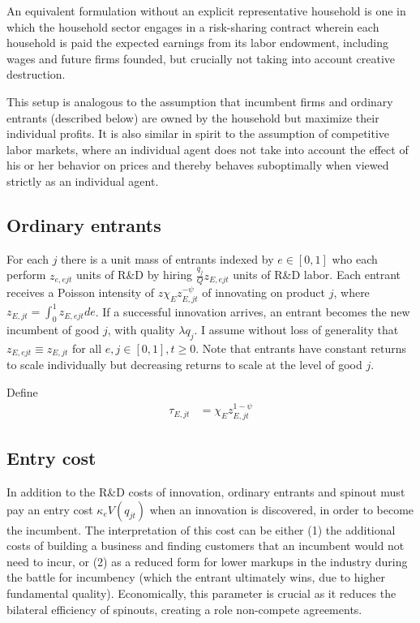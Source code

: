 \documentclass[12pt,english]{article}
\theoremstyle{remark}
\begin{document}
An equivalent formulation without an explicit representative household is one in which the household sector engages in a risk-sharing contract wherein each household is paid the expected earnings from its labor endowment, including wages and future firms founded, but crucially not taking into account creative destruction.  

This setup is analogous to the assumption that incumbent firms and ordinary entrants (described below) are owned by the household but maximize their individual profits. It is also similar in spirit to the assumption of competitive labor markets, where an individual agent does not take into account the effect of his or her behavior on prices and thereby behaves suboptimally when viewed strictly as an individual agent. 


\subsection{Ordinary entrants}

For each $j$ there is a unit mass of entrants indexed by $e \in [0,1]$ who each perform $z_{e,ejt}$ units of R\&D by hiring $\frac{q_j}{Q} z_{E,ejt}$ units of R\&D labor. Each entrant receives a Poisson intensity of $z \chi_E z_{E,jt}^{-\psi}$ of innovating on product $j$, where $z_{E,jt} = \int_0^1 z_{E,ejt} de$. If a successful innovation arrives, an entrant becomes the new incumbent of good $j$, with quality $\lambda q_j$. I assume without loss of generality that $z_{E,ejt} \equiv z_{E,jt}$ for all $e,j \in [0,1], t \ge 0$. Note that entrants have constant returns to scale individually but decreasing returns to scale at the level of good $j$.

Define
\begin{align*}
	\tau_{E,jt} &= \chi_E z_{E,jt}^{1-\psi}
\end{align*}


\subsection{Entry cost}

In addition to the R\&D costs of innovation, ordinary entrants and spinout must pay an entry cost $\kappa_{e} V(q_{jt})$ when an innovation is discovered, in order to become the incumbent. The interpretation of this cost can be either (1) the additional costs of building a business and finding customers that an incumbent would not need to incur, or (2) as a reduced form for lower markups in the industry during the battle for incumbency (which the entrant ultimately wins, due to higher fundamental quality). Economically, this parameter is crucial as it reduces the bilateral efficiency of spinouts, creating a role non-compete agreements. 
\end{document}
